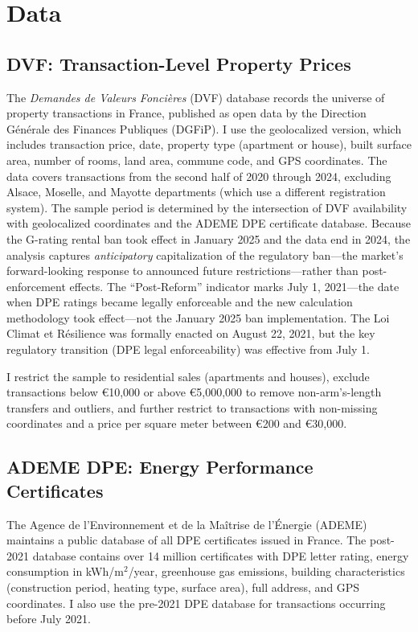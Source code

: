 \documentclass[12pt]{article}
\begin{document}
\section{Data}

\subsection{DVF: Transaction-Level Property Prices}

The \textit{Demandes de Valeurs Fonci\`eres} (DVF) database records the universe of property transactions in France, published as open data by the Direction G\'en\'erale des Finances Publiques (DGFiP). I use the geolocalized version, which includes transaction price, date, property type (apartment or house), built surface area, number of rooms, land area, commune code, and GPS coordinates. The data covers transactions from the second half of 2020 through 2024, excluding Alsace, Moselle, and Mayotte departments (which use a different registration system). The sample period is determined by the intersection of DVF availability with geolocalized coordinates and the ADEME DPE certificate database. Because the G-rating rental ban took effect in January 2025 and the data end in 2024, the analysis captures \textit{anticipatory} capitalization of the regulatory ban---the market's forward-looking response to announced future restrictions---rather than post-enforcement effects. The ``Post-Reform'' indicator marks July 1, 2021---the date when DPE ratings became legally enforceable and the new calculation methodology took effect---not the January 2025 ban implementation. The Loi Climat et R\'esilience was formally enacted on August 22, 2021, but the key regulatory transition (DPE legal enforceability) was effective from July 1.

I restrict the sample to residential sales (apartments and houses), exclude transactions below \euro{}10,000 or above \euro{}5,000,000 to remove non-arm's-length transfers and outliers, and further restrict to transactions with non-missing coordinates and a price per square meter between \euro{}200 and \euro{}30,000.

\subsection{ADEME DPE: Energy Performance Certificates}

The Agence de l'Environnement et de la Ma\^itrise de l'\'Energie (ADEME) maintains a public database of all DPE certificates issued in France. The post-2021 database contains over 14 million certificates with DPE letter rating, energy consumption in kWh/m$^2$/year, greenhouse gas emissions, building characteristics (construction period, heating type, surface area), full address, and GPS coordinates. I also use the pre-2021 DPE database for transactions occurring before July 2021.
\end{document}
